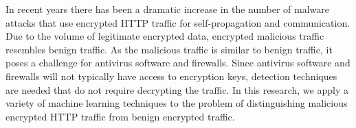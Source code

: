 In recent years there has been a dramatic increase in the number of malware attacks that 
use encrypted HTTP traffic for self-propagation and communication. Due to the volume
of legitimate encrypted data, encrypted malicious traffic resembles benign traffic. As the malicious 
traffic is similar to benign traffic, it poses a challenge for antivirus software and firewalls. 
Since antivirus software and firewalls will not typically have access to encryption keys,
detection techniques are needed that do not require decrypting the traffic. 
In this research, we apply a variety of machine learning techniques to the problem
of distinguishing malicious encrypted HTTP traffic from benign encrypted traffic.

